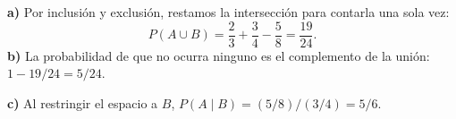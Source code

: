 \textbf{a)} Por inclusión y exclusión, restamos la intersección para contarla una sola vez:
\[
P(A\cup B)=\frac23+\frac34-\frac58=\boxed{\frac{19}{24}}.
\]
\textbf{b)} La probabilidad de que no ocurra ninguno es el complemento de la unión: $1-19/24=\boxed{5/24}$.

\textbf{c)} Al restringir el espacio a $B$, $P(A\mid B)=(5/8)/(3/4)=\boxed{5/6}$.

